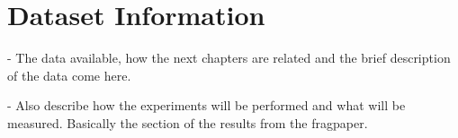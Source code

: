 
\chapter{Dataset Information}\label{ch:experiment}

- The data available, how the next chapters are related and the brief description of the data come here.

- Also describe how the experiments will be performed and what will be measured. Basically the section of the results from the fragpaper.

